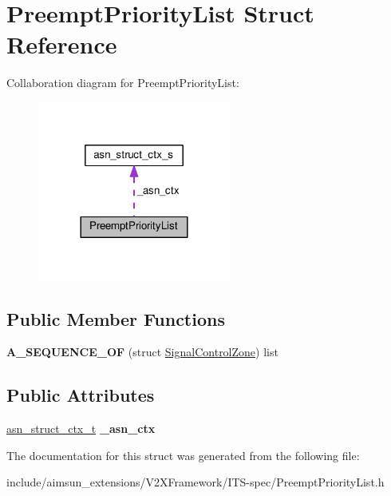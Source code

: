 \hypertarget{structPreemptPriorityList}{}\section{Preempt\+Priority\+List Struct Reference}
\label{structPreemptPriorityList}


Collaboration diagram for Preempt\+Priority\+List\+:\nopagebreak
\begin{figure}[H]
\begin{center}
\leavevmode
\includegraphics[width=180pt]{structPreemptPriorityList__coll__graph}
\end{center}
\end{figure}
\subsection*{Public Member Functions}
\begin{DoxyCompactItemize}
\item 
{\bfseries A\+\_\+\+S\+E\+Q\+U\+E\+N\+C\+E\+\_\+\+OF} (struct \hyperlink{structSignalControlZone}{Signal\+Control\+Zone}) list\hypertarget{structPreemptPriorityList_a4b8d41741c6da49fce955ff0ee49fe45}{}\label{structPreemptPriorityList_a4b8d41741c6da49fce955ff0ee49fe45}

\end{DoxyCompactItemize}
\subsection*{Public Attributes}
\begin{DoxyCompactItemize}
\item 
\hyperlink{structasn__struct__ctx__s}{asn\+\_\+struct\+\_\+ctx\+\_\+t} {\bfseries \+\_\+asn\+\_\+ctx}\hypertarget{structPreemptPriorityList_a84ac5c78620c3846044dfcd67ff479ad}{}\label{structPreemptPriorityList_a84ac5c78620c3846044dfcd67ff479ad}

\end{DoxyCompactItemize}


The documentation for this struct was generated from the following file\+:\begin{DoxyCompactItemize}
\item 
include/aimsun\+\_\+extensions/\+V2\+X\+Framework/\+I\+T\+S-\/spec/Preempt\+Priority\+List.\+h\end{DoxyCompactItemize}
